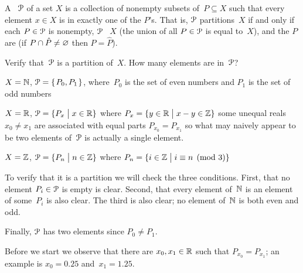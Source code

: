 \documentclass{test}  %
\begin{document}
\begin{df}
A ~$\EuScript{P}$ of a set $X$ is a 
collection of nonempty subsets of~$P\subseteq X$ such that every 
element $x\in X$ is in exactly one of the $P$'s.
That is, $\EuScript{P}$ partitions~$X$ if and only if each
$P\in\EuScript{P}$ is nonempty,
$\EuScript{P}$ ~$X$
(the union of all $P\in\EuScript{P}$ is equal to~$X$),
and the $P$ are 
(if $P\cap \hat{P}\neq\varnothing$ then $P=\hat{P}$).
\end{df}

\begin{center}
\end{center}

\begin{ex} Verify that~$\EuScript{P}$ is a partition of~$X$.  
  How many elements are in~$\EuScript{P}$?
\begin{exes}
\item $X=\mathbb{N}$, $\EuScript{P}=\mbox{$\{\hspace{0.1em}P_0,P_1\hspace{0.1em}\}$}$, 
  where~$P_0$ is the set of even numbers
  and $P_1$ is the set of odd numbers
\item $X=\mathbb{R}$, $\EuScript{P}=\{P_x \bigm| x\in \mathbb{R}\}$
      where $P_x=\{y\in\mathbb{R} \bigm| x-y\in \mathbb{Z}\}$
      \hspace{0.75em}\hint some unequal reals $x_0\neq x_1$ 
      are associated with equal parts $P_{x_0}=P_{x_1}$  
      so what may naively appear to be two elements of~$\EuScript{P}$
      is actually a single element.
\item $X=\mathbb{Z}$, $\EuScript{P}=\{P_n \bigm| n\in\mathbb{Z}\}$
      where $P_n=\{i\in\mathbb{Z} \bigm| i\equiv n\pmod 3\}$
\end{exes}
\begin{ans}
\begin{exes}
\item To verify that it is a partition we will check the three conditions.
  First, that no element $P_i\in \EuScript{P}$ is empty is clear.
  Second, that every element of~$\mathbb{N}$ is an element of some~$P_i$ is
  also clear.
  The third is also clear; no element of~$\mathbb{N}$ is both even and odd.

  Finally, $\EuScript{P}$ has two elements since $P_0\neq P_1$.
\item Before we start we observe that there are $x_0,x_1\in\mathbb{R}$ such that
  $P_{x_0}=P_{x_1}$; an example is $x_0=0.25$ and~$x_1=1.25$.


\end{exes}
\end{ans}
\end{ex}
\end{document}
